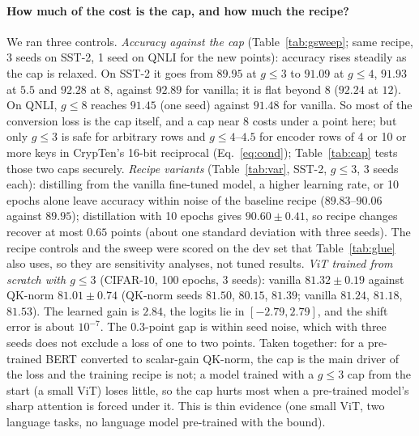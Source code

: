 \documentclass[11pt]{article}
\begin{document}
\paragraph{How much of the cost is the cap, and how much the recipe?} We ran three controls. \emph{Accuracy against the cap}
(Table~\ref{tab:gsweep}; same recipe, 3 seeds on SST-2, 1 seed on QNLI for the new points): accuracy rises steadily as the cap is relaxed. On
SST-2 it goes from $89.95$ at $g\le3$ to $91.09$ at $g\le4$, $91.93$ at $5.5$ and $92.28$ at $8$, against $92.89$ for vanilla; it is flat beyond
$8$ ($92.24$ at $12$). On QNLI, $g\le8$ reaches $91.45$ (one seed) against $91.48$ for vanilla. So most of the conversion loss is the cap
itself, and a cap near 8 costs under a point here; but only $g\le3$ is safe for arbitrary rows and $g\le4$--$4.5$ for encoder rows of 4 or 10 or more keys in CrypTen's 16-bit reciprocal (Eq.~\eqref{eq:cond}); Table~\ref{tab:cap} tests those two caps securely.
\emph{Recipe variants} (Table~\ref{tab:var}, SST-2, $g\le3$, 3 seeds each): distilling from the vanilla fine-tuned model, a higher learning
rate, or 10 epochs alone leave accuracy within noise of the baseline recipe ($89.83$--$90.06$ against $89.95$); distillation with 10 epochs gives
$90.60\pm0.41$, so recipe changes recover at most $0.65$ points (about one standard deviation with three seeds). The recipe controls and the
sweep were scored on the dev set that Table~\ref{tab:glue} also uses, so they are sensitivity analyses, not tuned results.
\emph{ViT trained from scratch with $g\le3$} (CIFAR-10, 100 epochs, 3 seeds): vanilla $81.32\pm0.19$ against QK-norm
$81.01\pm0.74$ (QK-norm seeds $81.50$, $80.15$, $81.39$; vanilla $81.24$, $81.18$, $81.53$). The learned gain is $2.84$, the logits lie in
$[-2.79,2.79]$, and the shift error is about $10^{-7}$. The $0.3$-point gap is within seed noise, which with three seeds does not exclude a loss of
one to two points. Taken together: for a pre-trained BERT converted to scalar-gain QK-norm, the cap is the main driver of the loss and the training
recipe is not; a model trained with a $g\le3$ cap from the start (a small ViT) loses little, so the cap hurts most when a pre-trained model's
sharp attention is forced under it. This is thin evidence (one small ViT, two language tasks, no language model pre-trained with the bound).
\end{document}
